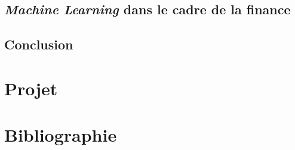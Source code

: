 \documentclass[a4paper, 11pt]{article}
\begin{document}
\subsection{\textit{Machine Learning} dans le cadre de la finance}
\subsection{Conclusion}
\newpage
\section{Projet}
\newpage
\section{Bibliographie}
\end{document}
